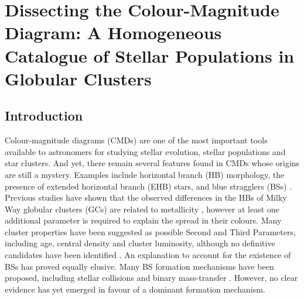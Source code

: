 \pagestyle{fancy}
\headheight 20pt
\chead{}
\lfoot{}
\cfoot{\thepage}
\rfoot{}
\renewcommand{\headrulewidth}{0.1pt}
\renewcommand{\footrulewidth}{0.1pt}




\chapter{Dissecting the
  Colour-Magnitude Diagram:  A Homogeneous Catalogue of Stellar
  Populations in
  Globular Clusters} \label{chapter4}
%
\thispagestyle{fancy}

\section{Introduction} \label{intro4}
Colour-magnitude diagrams (CMDs) are one of the most important tools
available to astronomers for studying stellar evolution, stellar
populations and star clusters.  And yet, there remain several
features found in CMDs whose origins are still a mystery.
Examples include horizontal branch (HB) morphology, the presence of
extended horizontal branch (EHB) stars, and blue stragglers (BSs) 
\citep[e.g.][]{sandage53, zinn96,
  peterson03, dotter10}.  Previous studies have shown that the
observed differences in the HBs of Milky Way globular clusters (GCs)
are related to metallicity \citep{sandage60}, however at least one
additional parameter is required to explain the spread in their
colours.  Many cluster properties have been suggested as possible
Second and Third Parameters, including age, central density and
cluster luminosity, although no definitive candidates have been
identified \citep[e.g.][]{rood73, fusi93}.  An 
explanation to account for the existence of BSs has proved equally
elusive.  Many BS formation mechanisms have been proposed,
including stellar collisions \citep[e.g.][]{leonard89, sills99} and
binary mass-transfer \citep{mccrea64, mathieu09}.  However, no clear
evidence has yet emerged in favour of a dominant formation
mechanism.    

